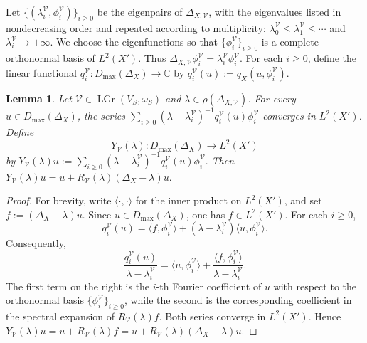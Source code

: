 \documentclass[12pt]{amsart}
\theoremstyle{plain}
\newtheorem{lem}[thm]{Lemma}
\theoremstyle{definition}
\theoremstyle{remark}
\numberwithin{equation}{section} \numberwithin{figure}{section}
\renewcommand*{\to}{\rightarrow}
\newcommand{\mb}[1]{\mathbb{#1}} %
\begin{document}
Let \(\{(\lambda_i^{\mathcal V},\phi_i^{\mathcal V})\}_{i\geq0}\)
be the eigenpairs of \(\Delta_{X,\mathcal V}\), with the eigenvalues
listed in nondecreasing order and repeated according to multiplicity:
\(\lambda_0^{\mathcal V}\leq\lambda_1^{\mathcal V}\leq\cdots\) and
\(\lambda_i^{\mathcal V}\to+\infty\). We choose the eigenfunctions so
that \(\{\phi_i^{\mathcal V}\}_{i\geq0}\) is a complete orthonormal
basis of \(L^2(X')\). Thus
\(\Delta_{X,\mathcal V}\phi_i^{\mathcal V}
=\lambda_i^{\mathcal V}\phi_i^{\mathcal V}\).
For each \(i\geq0\), define the linear functional
\(q_i^{\mathcal V}:D_{\max}(\Delta_X)\to\mb C\) by
\(
    q_i^{\mathcal V}(u)
    :=
    q_X(u,\phi_i^{\mathcal V}).
\)
\begin{lem}\label{lem:Y-series}
Let
\(\mathcal V\in\operatorname{LGr}(V_S,\omega_S)\) and
\(\lambda\in\rho(\Delta_{X,\mathcal V})\). For every
\(u\in D_{\max}(\Delta_X)\), the series
\(
    \sum_{i\geq0}
    (\lambda-\lambda_i^{\mathcal V})^{-1}
    q_i^{\mathcal V}(u)\phi_i^{\mathcal V}
\)
converges in \(L^2(X')\). Define
\[
    Y_{\mathcal V}(\lambda):
    D_{\max}(\Delta_X)
    \longrightarrow
    L^2(X')
\]
by
\(
    Y_{\mathcal V}(\lambda)u
    :=
    \sum_{i\geq0}
    (\lambda-\lambda_i^{\mathcal V})^{-1}
    q_i^{\mathcal V}(u)\phi_i^{\mathcal V}.
\)
Then
\(
    Y_{\mathcal V}(\lambda)u
    =
    u+R_{\mathcal V}(\lambda)(\Delta_X-\lambda)u.
\)
\end{lem}

\begin{proof}
For brevity, write
\(\langle\cdot,\cdot\rangle\) for the inner product on \(L^2(X')\),
and set \(f:=(\Delta_X-\lambda)u\). Since
\(u\in D_{\max}(\Delta_X)\), one has \(f\in L^2(X')\). For each
\(i\geq0\),
\[
    q_i^{\mathcal V}(u)
    =
    \langle f,\phi_i^{\mathcal V}\rangle
    +
    (\lambda-\lambda_i^{\mathcal V})
    \langle u,\phi_i^{\mathcal V}\rangle.
\]
Consequently,
\[
    \frac{q_i^{\mathcal V}(u)}
    {\lambda-\lambda_i^{\mathcal V}}
    =
    \langle u,\phi_i^{\mathcal V}\rangle
    +
    \frac{\langle f,\phi_i^{\mathcal V}\rangle}
    {\lambda-\lambda_i^{\mathcal V}}.
\]
The first term on the right is the \(i\)-th Fourier coefficient of
\(u\) with respect to the orthonormal basis
\(\{\phi_i^{\mathcal V}\}_{i\geq0}\), while the second is the
corresponding coefficient in the spectral expansion of
\(R_{\mathcal V}(\lambda)f\). Both series converge in \(L^2(X')\).
Hence
\(
    Y_{\mathcal V}(\lambda)u
    =
    u+R_{\mathcal V}(\lambda)f
    =
    u+R_{\mathcal V}(\lambda)(\Delta_X-\lambda)u.
\)
\end{proof}
\end{document}
